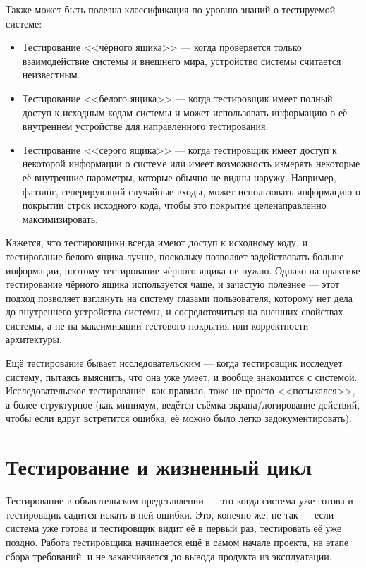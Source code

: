 \documentclass{../../text-style}
\begin{document}
Также может быть полезна классификация по уровню знаний о тестируемой системе:

\begin{itemize}
    \item Тестирование <<чёрного ящика>> --- когда проверяется только взаимодействие системы и внешнего мира, устройство системы считается неизвестным.
    \item Тестирование <<белого ящика>> --- когда тестировщик имеет полный доступ к исходным кодам системы и может использовать информацию о её внутреннем устройстве для направленного тестирования.
    \item Тестирование <<серого ящика>> --- когда тестировщик имеет доступ к некоторой информации о системе или имеет возможность измерять некоторые её внутренние параметры, которые обычно не видны наружу. Например, фаззинг, генерирующий случайные входы, может использовать информацию о покрытии строк исходного кода, чтобы это покрытие целенаправленно максимизировать.
\end{itemize}

Кажется, что тестировщики всегда имеют доступ к исходному коду, и тестирование белого ящика лучше, поскольку позволяет задействовать больше информации, поэтому тестирование чёрного ящика не нужно. Однако на практике тестирование чёрного ящика используется чаще, и зачастую полезнее --- этот подход позволяет взглянуть на систему глазами пользователя, которому нет дела до внутреннего устройства системы, и сосредоточиться на внешних свойствах системы, а не на максимизации тестового покрытия или корректности архитектуры.

Ещё тестирование бывает исследовательским --- когда тестировщик исследует систему, пытаясь выяснить, что она уже умеет, и вообще знакомится с системой. Исследовательское тестирование, как правило, тоже не просто <<потыкался>>, а более структурное (как минимум, ведётся съёмка экрана/логирование действий, чтобы если вдруг встретится ошибка, её можно было легко задокументировать).

\section{Тестирование и жизненный цикл}

Тестирование в обывательском представлении --- это когда система уже готова и тестировщик садится искать в ней ошибки. Это, конечно же, не так --- если система уже готова и тестировщик видит её в первый раз, тестировать её уже поздно. Работа тестировщика начинается ещё в самом начале проекта, на этапе сбора требований, и не заканчивается до вывода продукта из эксплуатации.
\end{document}
